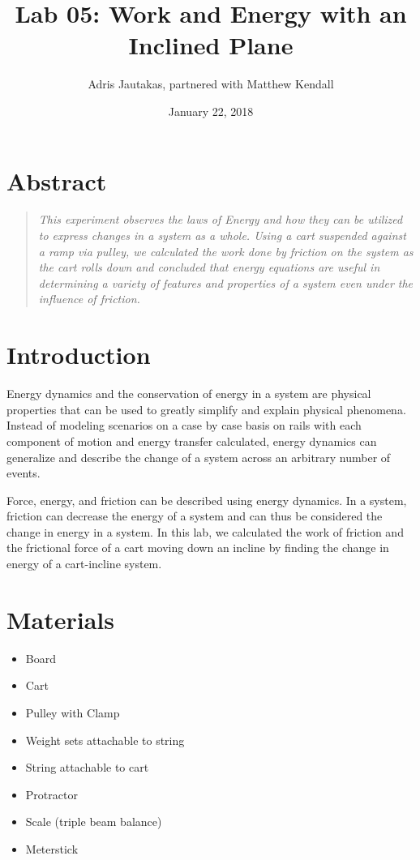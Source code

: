 \documentclass[12pt]{article}
\title{Lab 05: Work and Energy with an Inclined Plane}
\author{Adris Jautakas, partnered with Matthew Kendall}
\date{January 22, 2018}
\begin{document}
    \maketitle
    \pagebreak
    \section*{Abstract}
        \begin{quote}
        {\textit {\small 
            This experiment observes the laws of Energy and how they can be
            utilized to express changes in a system as a whole. Using a cart
            suspended against a ramp via pulley, we calculated the work done
            by friction on the system as the cart rolls down and concluded that
            energy equations are useful in determining a variety of features
            and properties of a system even under the influence of friction.
        } }
        \end{quote}

    \section{Introduction}
        \par Energy dynamics and the conservation of energy in a system are 
        physical properties that can be used to greatly simplify and explain 
        physical phenomena. Instead of modeling scenarios on a case by case 
        basis on rails with each component of motion and energy transfer 
        calculated, energy dynamics can generalize and describe the change of a
        system across an arbitrary number of events.
        \par Force, energy, and friction can be described using energy dynamics.
        In a system, friction can decrease the energy of a system and can thus
        be considered the change in energy in a system. In this lab, we 
        calculated the work of friction and the frictional force of a cart
        moving down an incline by finding the change in energy of a
        cart-incline system.
    \section{Materials}
        \begin{itemize}
            \item Board
            \item Cart
            \item Pulley with Clamp
            \item Weight sets attachable to string
            \item String attachable to cart
            \item Protractor
            \item Scale (triple beam balance)
            \item Meterstick
        \end{itemize}
\end{document}
